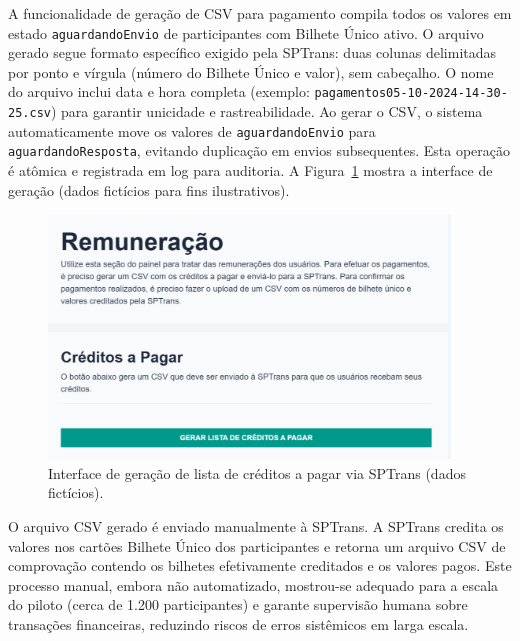A funcionalidade de geração de CSV
para pagamento compila todos os valores em estado \texttt{aguardandoEnvio} de
participantes com Bilhete Único ativo. O arquivo gerado segue formato específico
exigido pela SPTrans: duas colunas delimitadas por ponto e vírgula (número do
Bilhete Único e valor), sem cabeçalho. O nome do arquivo inclui data e hora completa (exemplo:
\texttt{pagamentos05-10-2024-14-30-25.csv}) para garantir unicidade e
rastreabilidade. Ao gerar o CSV, o sistema automaticamente move os valores de
\texttt{aguardandoEnvio} para \texttt{aguardandoResposta}, evitando duplicação em
envios subsequentes. Esta operação é atômica e registrada em log para auditoria. A Figura~\ref{fig:remuneracao_gerar_csv_form_creditos} mostra a interface de geração (dados fictícios para fins ilustrativos).

\begin{figure}[H]
    \centering
    \includegraphics[width=0.95\textwidth]{figuras/remuneracao_creditos.png}
    \caption{Interface de geração de lista de créditos a pagar via SPTrans (dados fictícios).}
    \label{fig:remuneracao_gerar_csv_form_creditos}
  \end{figure}

O arquivo CSV gerado é enviado
manualmente à SPTrans. A SPTrans credita os valores nos cartões Bilhete
Único dos participantes e retorna um arquivo CSV de comprovação contendo os bilhetes
efetivamente creditados e os valores pagos. Este processo manual, embora não
automatizado, mostrou-se adequado para a escala do piloto (cerca de 1.200
participantes) e garante supervisão humana sobre transações financeiras, reduzindo
riscos de erros sistêmicos em larga escala.



